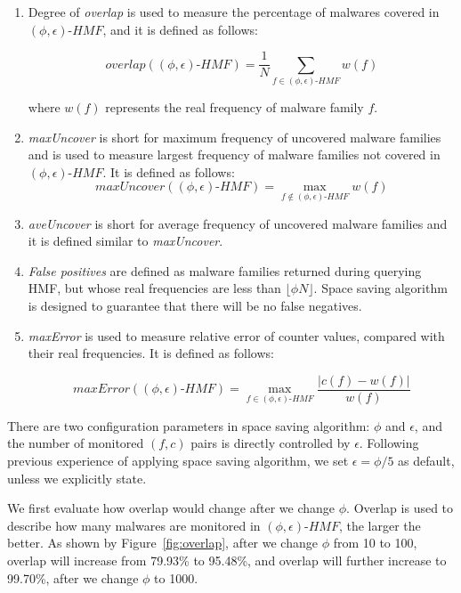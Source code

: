 \begin{enumerate}

\item 
Degree of \textit{overlap} is used to measure the percentage of malwares covered in $(\phi, \epsilon)\mbox{-}HMF$,
and it is defined as follows:

$$overlap((\phi, \epsilon)\mbox{-}HMF) = \dfrac{1}{N}\sum_{f \in (\phi, \epsilon)\mbox{-}HMF}w(f)$$

where $w(f)$ represents the real frequency of malware family $f$.  

\item 
\textit{maxUncover} is short for maximum frequency of uncovered malware families and 
is used 
to measure largest frequency of malware families not covered in $(\phi, \epsilon)\mbox{-}HMF$. 
It is defined as follows:
$$maxUncover((\phi, \epsilon)\mbox{-}HMF) = \max_{f \notin (\phi, \epsilon)\mbox{-}HMF}w(f)$$

\item 
\textit{aveUncover} is short for average frequency of uncovered malware families 
and it is defined similar to \textit{maxUncover}. 

\item 
\textit{False positives} are defined as malware families returned during querying HMF, 
but whose real frequencies are less than $\lfloor \phi N \rfloor$. 
Space saving algorithm is designed to guarantee that there will be no false negatives. 

\item 
\textit{maxError} is used to measure relative error of counter values, 
compared with their real frequencies.
It is defined as follows:

$$maxError((\phi, \epsilon)\mbox{-}HMF) = \max_{f \in (\phi, \epsilon)\mbox{-}HMF} \dfrac{\left|c(f) - w(f)\right|}{w(f)}$$


\end{enumerate}

There are two configuration parameters in space saving algorithm: $\phi$ and $\epsilon$, 
and the number of monitored $(f, c)$ pairs is directly controlled by $\epsilon$. 
Following previous experience of applying space saving algorithm, we set $\epsilon = \phi/5$ as default, 
unless we explicitly state.  

We first evaluate how overlap would change after we change $\phi$. 
Overlap is used to describe how many malwares are monitored in $(\phi, \epsilon)\mbox{-}HMF$, the larger the better. 
As shown by Figure~\ref{fig:overlap}, after we change $\phi$ from 10 to 100, 
overlap will increase from 79.93\% to 95.48\%, and overlap will further increase to 99.70\%, after we change $\phi$ to 1000. 

